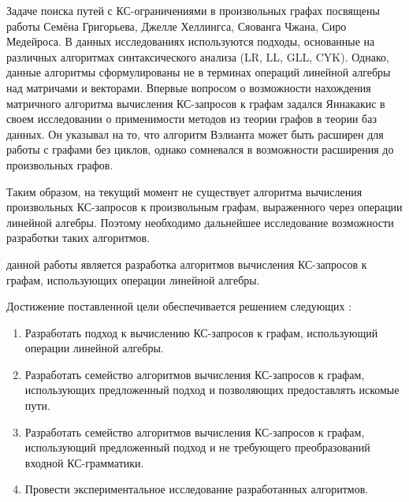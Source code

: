 Задаче поиска путей с КС-ограничениями в произвольных графах посвящены работы Семёна Григорьева, Джелле Хеллингса, Сяованга Чжана, Сиро Медейроса. В данных исследованиях используются подходы, основанные на различных алгоритмах синтаксического анализа (LR, LL, GLL, CYK). Однако, данные алгоритмы сформулированы не в терминах операций линейной алгебры над матричами и векторами. Впервые вопросом о возможности нахождения матричного алгоритма вычисления КС-запросов к графам задался Яннакакис в своем исследовании о применимости методов из теории графов в теории баз данных. Он указывал на то, что алгоритм Вэлианта может быть расширен для работы с графами без циклов, однако сомневался в возможности расширения до произвольных графов.

Таким образом, на текущий момент не существует алгоритма вычисления произвольных КС-запросов к произвольным графам, выраженного через операции линейной алгебры. Поэтому необходимо дальнейшее исследование возможности разработки таких алгоритмов.

{\aim} данной работы является разработка алгоритмов вычисления КС-запросов к графам, использующих операции линейной алгебры.

Достижение поставленной цели обеспечивается решением следующих {\tasks}:
\begin{enumerate}[beginpenalty=10000] %
  \item Разработать подход к вычислению КС-запросов к графам, использующий операции линейной алгебры.
  \item Разработать семейство алгоритмов вычисления КС-запросов к графам, использующих предложенный подход и позволяющих предоставлять искомые пути.
  \item Разработать семейство алгоритмов вычисления КС-запросов к графам, использующий предложенный подход и не требующего преобразований входной КС-грамматики.
  \item Провести экспериментальное исследование разработанных алгоритмов.
\end{enumerate}


